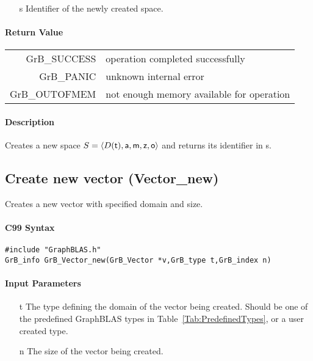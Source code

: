 \documentclass[11pt]{extarticle}
\begin{document}
\begin{itemize}
	\item[{\sf s}] Identifier of the newly created space.
\end{itemize}

\paragraph{Return Value}

\begin{tabular}{rl} 
{\sf GrB\_SUCCESS} 	& operation completed successfully \\
{\sf GrB\_PANIC}	& unknown internal error \\
{\sf GrB\_OUTOFMEM}	& not enough memory available for operation \\
\end{tabular}

\paragraph{Description}

Creates a new space $S = \langle D({\sf t}), {\sf a}, {\sf m}, {\sf z}, {\sf o} \rangle$ and
returns its identifier in {\sf s}.

\subsection{Create new vector ({\sf Vector\_new})}

Creates a new vector with specified domain and size.

\paragraph{C99 Syntax}

\begin{verbatim}
#include "GraphBLAS.h"
GrB_info GrB_Vector_new(GrB_Vector *v,GrB_type t,GrB_index n)
\end{verbatim}

\paragraph{Input Parameters}

\begin{itemize}
	\item[{\sf t}] The type defining the domain of the vector being created. Should be one of the predefined
	GraphBLAS types in Table~\ref{Tab:PredefinedTypes}, or a user created type.
	\item[{\sf n}] The size of the vector being created.
\end{itemize}
\end{document}

